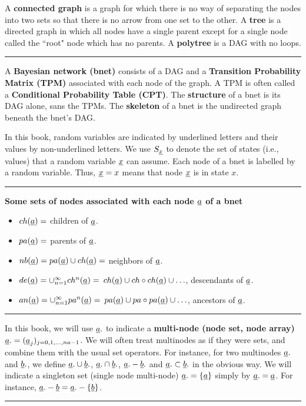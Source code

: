 A {\bf connected graph}
is a graph for which there
is no way of separating
the nodes into
two sets so that there is no arrow
from one set to the other.
A {\bf tree}
is a directed graph
in which all nodes
have a single parent
except for a single
node called the ``root" node
which has no parents.
A {\bf polytree}
is a DAG with
no loops.





\hrule

A {\bf Bayesian network (bnet)}
consists of a DAG
and a
{\bf Transition
Probability Matrix (TPM)}
associated
with each node
of the graph.
A TPM is often
called a {\bf Conditional Probability
Table
(CPT)}.
The {\bf structure} of a bnet
is its DAG alone, sans the TPMs.
The
{\bf skeleton} of a bnet is the
undirected graph beneath the bnet's
DAG.



In
this book,
random  variables are
 indicated by
underlined letters and their values
by non-underlined letters.
We use $S_{\underline{x}}$
to denote the set of states (i.e., values)
that a random variable ${\underline{x}}$ can assume.
 Each node of a bnet is
 labelled by a random variable.
 Thus, ${\underline{x}}=x$ means that node
${\underline{x}}$ is in state $x$.

\hrule\noindent
{\bf Some sets of nodes
associated
with each node ${\underline{a}}$
of a bnet}
\begin{itemize}
\item
$ch({\underline{a}})=$ children of ${\underline{a}}$.
\item
$pa({\underline{a}})=$ parents of ${\underline{a}}$.
\item
$nb({\underline{a}})=pa({\underline{a}})\cup ch({\underline{a}})=$
neighbors of ${\underline{a}}$.
\item
$de({\underline{a}})=\cup_{n=1}^{\infty}ch^n({\underline{a}})=$
$ch({\underline{a}})\cup ch\circ ch({\underline{a}})\cup\ldots$,
descendants of ${\underline{a}}$.
\item
$an({\underline{a}})=\cup_{n=1}^{\infty}pa^n({\underline{a}})=$
$pa({\underline{a}})\cup pa\circ pa({\underline{a}})\cup\ldots$,
ancestors of ${\underline{a}}$.
\end{itemize}
\hrule
In this book,
we will use
${\underline{a}}.$
to indicate
a {\bf multi-node (node set,
node array)} ${\underline{a}}.=
({\underline{a}}_j)_{j=0, 1, \ldots , na-1}$.
We will often
treat multinodes as if
they were sets, and
combine them with
the usual
set
operators.
For instance,
for two
multinodes ${\underline{a}}.$
and ${\underline{b}}.$,
we define
${\underline{a}}.\cup{\underline{b}}.$,
${\underline{a}}.\cap{\underline{b}}.$,
${\underline{a}}.-{\underline{b}}.$
and
${\underline{a}}.\subset{\underline{b}}.$
in the obvious way.
We
will indicate
a singleton set (single
node multi-node) ${\underline{a}}.=\{{\underline{a}}\}$
simply by ${\underline{a}}.={\underline{a}}$.
For instance,
${\underline{a}}.-{\underline{b}}={\underline{a}}.-\{{\underline{b}}\}$.
\hrule

